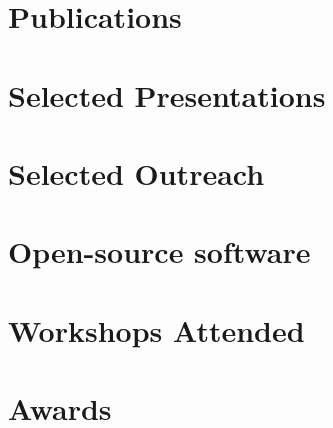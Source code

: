 \documentclass[12pt, letterpaper]{hunt-cv}
\begin{document}



\section*{Publications}


\section*{Selected Presentations}


\section*{Selected Outreach}


\section*{Open-source software \href{\cvGitHubLink}{\faGithub}}


\section*{Workshops Attended}


\section*{Awards}

\end{document}
